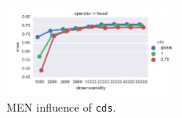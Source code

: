 \begin{figure}[b]
  \centering

  \includegraphics[width=0.5\textwidth]{supplement/figures/men-interaction-cds}

  \caption{MEN influence of \texttt{cds}.}
  \label{fig:men-cds}
\end{figure}
